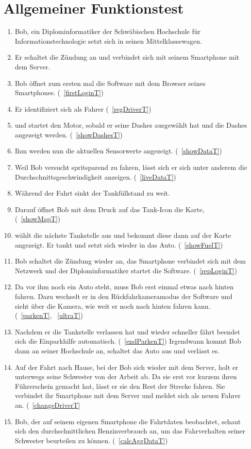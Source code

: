 \documentclass[pflichtenheft.tex]{subfiles}
\begin{document}
\section{Allgemeiner Funktionstest}
\begin{enumerate}
\item
Bob, ein Diplominformatiker der Schwäbischen Hochschule für Informationstechnologie setzt sich in seinen Mittelklassewagen. 
\item
Er schaltet die Zündung an und verbindet sich mit seinem Smartphone mit dem Server. 
\item
Bob öffnet  zum ersten mal die Software mit dem Browser seines Smartphones.  (~\ref{firstLoginT})
\item
Er identifiziert sich als Fahrer (~\ref{regDriverT})
\item
und startet den Motor, sobald er seine Dashes ausgewählt hat und die Dashes angezeigt werden. (~\ref{showDashesT})
\item
Ihm werden nun die aktuellen Sensorwerte angezeigt. (~\ref{showDataT})
\item
Weil Bob versucht spritsparend zu fahren, lässt sich er sich unter anderem die Durchschnittsgeschwindigkeit anzeigen. (~\ref{liveDataT})
\item
Während der Fahrt sinkt der Tankfüllstand zu weit.
\item
 Darauf öffnet Bob mit dem Druck auf das Tank-Icon die Karte, (~\ref{showMapT})
\item
wählt die nächste Tankstelle aus und bekommt diese dann auf der Karte angezeigt. Er tankt und setzt sich wieder in das Auto. (~\ref{showFuelT})
\item
Bob schaltet die Zündung wieder an, das Smartphone verbindet sich mit dem Netzwerk und der Diplominformatiker startet die Software. (~\ref{repLoginT})
\item
Da vor ihm noch ein Auto steht, muss Bob erst einmal etwas nach hinten fahren. Dazu wechselt er in den Rückfahrkameramodus der Software und sieht über die Kamera, wie weit er noch nach hinten fahren kann. (~\ref{parkenT}, ~\ref{ultraT})
\item
Nachdem er die Tankstelle verlassen hat und wieder schneller fährt beendet sich die Einparkhilfe automatisch. (~\ref{endParkenT}) Irgendwann kommt Bob dann an seiner Hochschule an, schaltet das Auto aus und verlässt es. 
\item
Auf der Fahrt nach Hause, bei der Bob sich wieder mit dem Server, holt er unterwegs seine Schwester von der Arbeit ab. Da sie erst vor kurzem ihren Führerschein gemacht hat, lässt er sie den Rest der Strecke fahren. Sie verbindet ihr Smartphone mit dem Server und meldet sich als neuen Fahrer an. (~\ref{changeDriverT}
\item
Bob, der auf seinem eigenen Smartphone die Fahrtdaten beobachtet, schaut sich den durchschnittlichen Benzinverbrauch an, um das Fahrverhalten seiner Schwester beurteilen zu können. (~\ref{calcAggDataT})
\end{enumerate}
\end{document}
